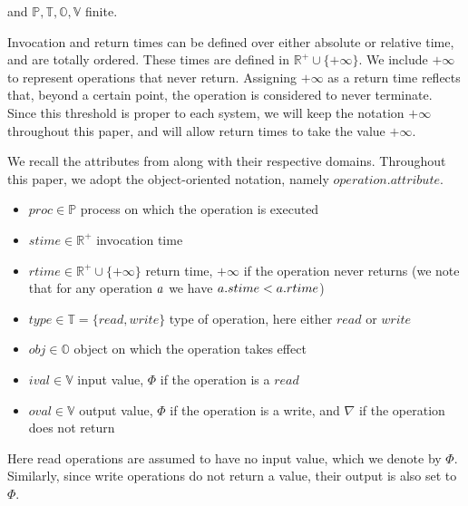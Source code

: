 \documentclass[12pt]{article}
\begin{document}
and $\mathbb{P},\mathbb{T},\mathbb{O},\mathbb{V}$ finite.

Invocation and return times can be defined over either absolute or relative time, and are totally ordered. These times are defined in $\mathbb{R}^+\cup \{+\infty\}$. We include $+\infty$ to represent operations that never return. Assigning $+\infty$ as a return time reflects that, beyond a certain point, the operation is considered to never terminate. Since this threshold is proper to each system, we will keep the notation $+\infty$ throughout this paper, and will allow return times to take the value $+\infty$. 


We recall the attributes from  along with their respective domains. Throughout this paper, we adopt the object-oriented notation, namely $operation.attribute$.

\begin{itemize}[label=$\ast$,itemsep=0pt,parsep=0pt]
	\item $proc\in \mathbb{P}$ process on which the operation is executed
	\item $stime\in \mathbb{R}^+$ invocation time
	\item $rtime\in \mathbb{R}^+\cup \{+\infty\}$ return time, $+\infty$ if the operation never returns (we note that for any operation $a$ we have $a.stime<a.rtime$)
	\item $type\in \mathbb{T}=\{read,write\}$ type of operation, here either $read$ or $write$
	\item $obj\in \mathbb{O}$ object on which the operation takes effect
	\item $ival\in \mathbb{V}$ input value, $\Phi$ if the operation is a $read$
	\item $oval\in \mathbb{V}$ output value, $\Phi$ if the operation is a write, and $\nabla$ if the operation does not return
\end{itemize}

Here read operations are assumed to have no input value, which we denote by $\Phi$. Similarly, since write operations do not return a value, their output is also set to  $\Phi$.
\end{document}
